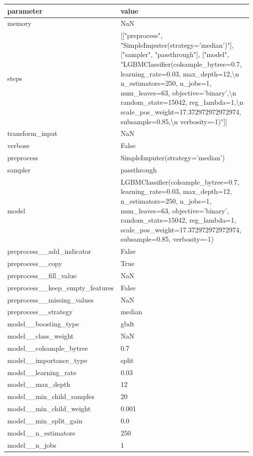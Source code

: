 \begin{tabular}{ll}
\toprule
parameter & value \\
\midrule
memory & NaN \\
steps & [["preprocess", "SimpleImputer(strategy='median')"], ["sampler", "passthrough"], ["model", "LGBMClassifier(colsample\_bytree=0.7, learning\_rate=0.03, max\_depth=12,\textbackslash n               n\_estimators=250, n\_jobs=1, num\_leaves=63, objective='binary',\textbackslash n               random\_state=15042, reg\_lambda=1,\textbackslash n               scale\_pos\_weight=17.372972972972974, subsample=0.85,\textbackslash n               verbosity=-1)"]] \\
transform\_input & NaN \\
verbose & False \\
preprocess & SimpleImputer(strategy='median') \\
sampler & passthrough \\
model & LGBMClassifier(colsample\_bytree=0.7, learning\_rate=0.03, max\_depth=12,
               n\_estimators=250, n\_jobs=1, num\_leaves=63, objective='binary',
               random\_state=15042, reg\_lambda=1,
               scale\_pos\_weight=17.372972972972974, subsample=0.85,
               verbosity=-1) \\
preprocess\_\_add\_indicator & False \\
preprocess\_\_copy & True \\
preprocess\_\_fill\_value & NaN \\
preprocess\_\_keep\_empty\_features & False \\
preprocess\_\_missing\_values & NaN \\
preprocess\_\_strategy & median \\
model\_\_boosting\_type & gbdt \\
model\_\_class\_weight & NaN \\
model\_\_colsample\_bytree & 0.7 \\
model\_\_importance\_type & split \\
model\_\_learning\_rate & 0.03 \\
model\_\_max\_depth & 12 \\
model\_\_min\_child\_samples & 20 \\
model\_\_min\_child\_weight & 0.001 \\
model\_\_min\_split\_gain & 0.0 \\
model\_\_n\_estimators & 250 \\
model\_\_n\_jobs & 1 \\

\end{tabular}
